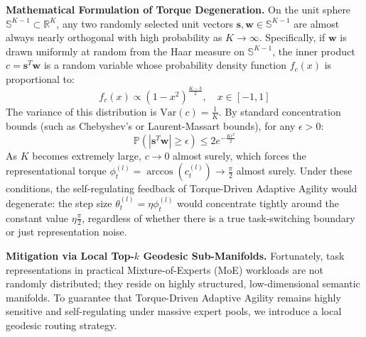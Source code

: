 \documentclass{article}
\theoremstyle{plain}
\theoremstyle{definition}
\theoremstyle{remark}
\begin{document}
\textbf{Mathematical Formulation of Torque Degeneration.}
On the unit sphere $\mathbb{S}^{K-1} \subset \mathbb{R}^K$, any two randomly selected unit vectors $\mathbf{s}, \mathbf{w} \in \mathbb{S}^{K-1}$ are almost always nearly orthogonal with high probability as $K \to \infty$. Specifically, if $\mathbf{w}$ is drawn uniformly at random from the Haar measure on $\mathbb{S}^{K-1}$, the inner product $c = \mathbf{s}^T \mathbf{w}$ is a random variable whose probability density function $f_c(x)$ is proportional to:
\begin{equation}
f_c(x) \propto \left(1 - x^2\right)^{\frac{K-3}{2}}, \quad x \in [-1, 1]
\end{equation}
The variance of this distribution is $\text{Var}(c) = \frac{1}{K}$. By standard concentration bounds (such as Chebyshev's or Laurent-Massart bounds), for any $\epsilon > 0$:
\begin{equation}
\mathbb{P}\left(\left|\mathbf{s}^T \mathbf{w}\right| \ge \epsilon\right) \le 2 e^{-\frac{K \epsilon^2}{2}}
\end{equation}
As $K$ becomes extremely large, $c \to 0$ almost surely, which forces the representational torque $\phi_t^{(l)} = \arccos(c_t^{(l)}) \to \frac{\pi}{2}$ almost surely. Under these conditions, the self-regulating feedback of Torque-Driven Adaptive Agility would degenerate: the step size $\theta_t^{(l)} = \eta \phi_t^{(l)}$ would concentrate tightly around the constant value $\eta \frac{\pi}{2}$, regardless of whether there is a true task-switching boundary or just representation noise.

\textbf{Mitigation via Local Top-$k$ Geodesic Sub-Manifolds.}
Fortunately, task representations in practical Mixture-of-Experts (MoE) workloads are not randomly distributed; they reside on highly structured, low-dimensional semantic manifolds. To guarantee that Torque-Driven Adaptive Agility remains highly sensitive and self-regulating under massive expert pools, we introduce a local geodesic routing strategy. 
\end{document}
